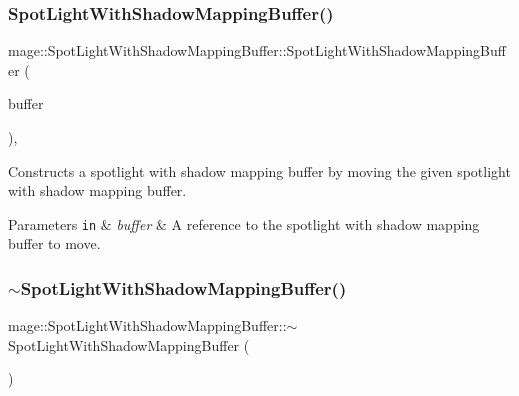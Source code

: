 \subsubsection{\texorpdfstring{Spot\+Light\+With\+Shadow\+Mapping\+Buffer()}{SpotLightWithShadowMappingBuffer()}\hspace{0.1cm}{\footnotesize\ttfamily [3/3]}}
{\footnotesize\ttfamily mage\+::\+Spot\+Light\+With\+Shadow\+Mapping\+Buffer\+::\+Spot\+Light\+With\+Shadow\+Mapping\+Buffer (\begin{DoxyParamCaption}\item[{\hyperlink{structmage_1_1_spot_light_with_shadow_mapping_buffer}{Spot\+Light\+With\+Shadow\+Mapping\+Buffer} \&\&}]{buffer }\end{DoxyParamCaption})\hspace{0.3cm}{\ttfamily [default]}, {\ttfamily [noexcept]}}

Constructs a spotlight with shadow mapping buffer by moving the given spotlight with shadow mapping buffer.


\begin{DoxyParams}[1]{Parameters}
\mbox{\tt in}  & {\em buffer} & A reference to the spotlight with shadow mapping buffer to move. \\
\hline
\end{DoxyParams}
\hypertarget{structmage_1_1_spot_light_with_shadow_mapping_buffer_ae96fbec68878382084dce0147da2eb72}{}\label{structmage_1_1_spot_light_with_shadow_mapping_buffer_ae96fbec68878382084dce0147da2eb72} 
\subsubsection{\texorpdfstring{$\sim$\+Spot\+Light\+With\+Shadow\+Mapping\+Buffer()}{~SpotLightWithShadowMappingBuffer()}}
{\footnotesize\ttfamily mage\+::\+Spot\+Light\+With\+Shadow\+Mapping\+Buffer\+::$\sim$\+Spot\+Light\+With\+Shadow\+Mapping\+Buffer (\begin{DoxyParamCaption}{ }\end{DoxyParamCaption})\hspace{0.3cm}{\ttfamily [default]}}

